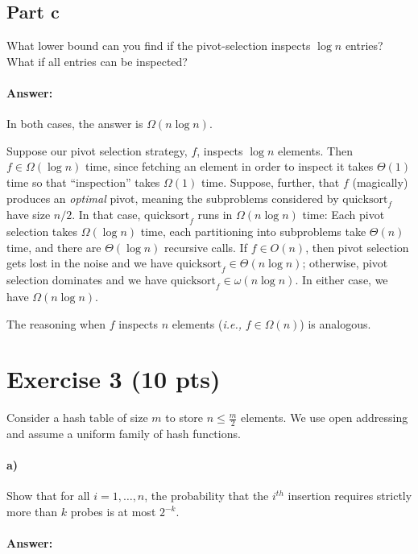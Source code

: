 \documentclass[a4paper]{article}
\newcommand{\ie}{\emph{i.e.,} }
\begin{document}
\subsection{Part c}

What lower bound can you find if the pivot-selection inspects $\log n$ entries?
What if all entries can be inspected?

\paragraph{Answer:}
In both cases, the answer is $\Omega(n \log n)$.

Suppose our pivot selection strategy, $f$, inspects $\log n$ elements.
Then $f \in \Omega(\log n)$ time, since fetching an element in order to inspect it takes $\Theta(1)$ time so that ``inspection'' takes $\Omega(1)$ time.
Suppose, further, that $f$ (magically) produces an \emph{optimal} pivot, meaning the subproblems considered by $\text{quicksort}_f$ have size $n/2$.
In that case, $\text{quicksort}_f$ runs in $\Omega(n \log n)$ time:
Each pivot selection takes $\Omega(\log n)$ time,
each partitioning into subproblems take $\Theta(n)$ time,
and there are $\Theta(\log n)$ recursive calls.
If $f \in O(n)$, then pivot selection gets lost in the noise and we have $\text{quicksort}_f \in \Theta(n \log n)$;
otherwise, pivot selection dominates and we have $\text{quicksort}_f \in \omega(n \log n)$.
In either case, we have $\Omega(n \log n)$.

The reasoning when $f$ inspects $n$ elements (\ie $f \in \Omega(n)$) is analogous.



\section{Exercise 3 (10 pts)}

\noindent Consider a hash table of size $m$ to store $n \le  \frac{m}{2}$ elements. We use open addressing and assume a uniform family of hash functions.

\paragraph{a)} Show that for all $i = 1, \ldots, n$, the probability that the $i^{th}$ insertion requires strictly more than $k$ probes is at most $2^{-k}$.

\paragraph{Answer:}
\end{document}
